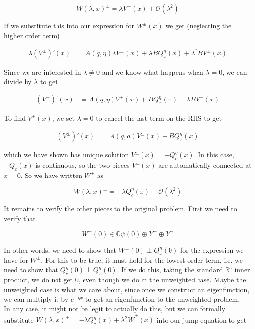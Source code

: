 \documentclass[12pt]{article}
\def\R{{\mathbb R}}
\def\C{{\mathbb C}}
\begin{document}
\[
W(\lambda, x)^\pm = \lambda V^\pm(x) + \mathcal{O}(\lambda^2)
\]

If we substitute this into our expression for $W^\pm(x)$ we get (neglecting the higher order term)

\begin{align*}
\lambda (V^\pm)'(x) &= A(q, \eta) \lambda V^\pm(x) + \lambda B Q^\eta_x(x) + \lambda^2 B V^\pm(x) 
\end{align*}

Since we are interested in $\lambda \neq 0$ and we know what happens when $\lambda = 0$, we can divide by $\lambda$ to get

\begin{align*}
(V^\pm)'(x) &= A(q, \eta)V^\pm(x) + B Q^\eta_x(x) + \lambda B V^\pm(x) 
\end{align*}

To find $V^\pm(x)$, we set $\lambda = 0$ to cancel the last term on the RHS to get

\begin{align*}
(V^\pm)'(x) &= A(q, a) V^\pm(x) + B Q^\eta_x(x) 
\end{align*}

which we have shown has unique solution $V^\pm(x) = -Q^\eta_c(x)$. In this case, $-Q_c(x)$ is continuous, so the two pieces $V^\pm(x)$ are automatically connected at $x = 0$. So we have written $W^\pm$ as

\[
W(\lambda, x)^\pm = -\lambda Q^\eta_c(x) + \mathcal{O}(\lambda^2)
\]

It remains to verify the other pieces to the original problem. First we need to verify that

\[
W^\pm(0) \in \C \psi(0) \oplus Y^+ \oplus Y^- 
\]

In other words, we need to show that $W^\pm(0) \perp Q^\eta_x(0)$ for the expression we have for $W^\pm$. For this to be true, it must hold for the lowest order term, i.e. we need to show that $Q^\eta_c(0) \perp Q^\eta_x(0)$. If we do this, taking the standard $\R^5$ inner product, we do not get 0, even though we do in the unweighted case. Maybe the unweighted case is what we care about, since once we construct an eigenfunction, we can multiply it by $e^{-\eta x}$ to get an eigenfunction to the unweighted problem. 
\\

In any case, it might not be legit to actually do this, but we can formally substitute $W(\lambda, x)^\pm = -\lambda Q^\eta_c(x) + \lambda^2 \tilde{W}^\pm(x)$ into our jump equation to get
\end{document}
